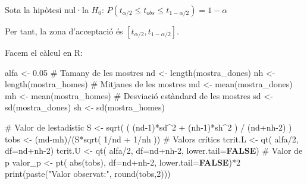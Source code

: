 \documentclass[
]{article}
\newenvironment{Shaded}{\begin{snugshade}}{\end{snugshade}}
\newcommand{\AttributeTok}[1]{\textcolor[rgb]{0.80,0.80,0.80}{#1}}
\newcommand{\CommentTok}[1]{\textcolor[rgb]{0.50,0.62,0.50}{#1}}
\newcommand{\ConstantTok}[1]{\textcolor[rgb]{0.86,0.64,0.64}{\textbf{#1}}}
\newcommand{\DecValTok}[1]{\textcolor[rgb]{0.86,0.86,0.80}{#1}}
\newcommand{\FloatTok}[1]{\textcolor[rgb]{0.75,0.75,0.82}{#1}}
\newcommand{\FunctionTok}[1]{\textcolor[rgb]{0.94,0.94,0.56}{#1}}
\newcommand{\NormalTok}[1]{\textcolor[rgb]{0.80,0.80,0.80}{#1}}
\newcommand{\OtherTok}[1]{\textcolor[rgb]{0.94,0.94,0.56}{#1}}
\newcommand{\SpecialCharTok}[1]{\textcolor[rgb]{0.86,0.64,0.64}{#1}}
\newcommand{\StringTok}[1]{\textcolor[rgb]{0.80,0.58,0.58}{#1}}
\begin{document}
Sota la hipòtesi nul·la \(H_0\):
\(P(t_{\alpha/2}\le t_{obs} \le t_{1-\alpha/2})=1-\alpha\)

Per tant, la zona d'acceptació és \([t_{\alpha/2},t_{1-\alpha/2}]\).

Facem el càlcul en R:

\begin{Shaded}
\begin{Highlighting}[]
\NormalTok{alfa    }\OtherTok{\textless{}{-}} \FloatTok{0.05}
\CommentTok{\# Tamany de les mostres}
\NormalTok{nd }\OtherTok{\textless{}{-}} \FunctionTok{length}\NormalTok{(mostra\_dones)}
\NormalTok{nh }\OtherTok{\textless{}{-}} \FunctionTok{length}\NormalTok{(mostra\_homes)}
\CommentTok{\# Mitjanes de les mostres}
\NormalTok{md }\OtherTok{\textless{}{-}} \FunctionTok{mean}\NormalTok{(mostra\_dones)}
\NormalTok{mh }\OtherTok{\textless{}{-}} \FunctionTok{mean}\NormalTok{(mostra\_homes)}
\CommentTok{\# Desviació estàndard de les mostres}
\NormalTok{sd }\OtherTok{\textless{}{-}} \FunctionTok{sd}\NormalTok{(mostra\_dones)}
\NormalTok{sh }\OtherTok{\textless{}{-}} \FunctionTok{sd}\NormalTok{(mostra\_homes)}

\CommentTok{\# Valor de l\textquotesingle{}estadístic}
\NormalTok{S    }\OtherTok{\textless{}{-}} \FunctionTok{sqrt}\NormalTok{( ( (nd}\DecValTok{{-}1}\NormalTok{)}\SpecialCharTok{*}\NormalTok{sd}\SpecialCharTok{\^{}}\DecValTok{2} \SpecialCharTok{+}\NormalTok{ (nh}\DecValTok{{-}1}\NormalTok{)}\SpecialCharTok{*}\NormalTok{sh}\SpecialCharTok{\^{}}\DecValTok{2}\NormalTok{ ) }\SpecialCharTok{/}\NormalTok{ (nd}\SpecialCharTok{+}\NormalTok{nh}\DecValTok{{-}2}\NormalTok{) )}
\NormalTok{tobs }\OtherTok{\textless{}{-}}\NormalTok{ (md}\SpecialCharTok{{-}}\NormalTok{mh)}\SpecialCharTok{/}\NormalTok{(S}\SpecialCharTok{*}\FunctionTok{sqrt}\NormalTok{( }\DecValTok{1}\SpecialCharTok{/}\NormalTok{nd }\SpecialCharTok{+} \DecValTok{1}\SpecialCharTok{/}\NormalTok{nh ))}
\CommentTok{\# Valors crítics}
\NormalTok{tcrit.L }\OtherTok{\textless{}{-}} \FunctionTok{qt}\NormalTok{( alfa}\SpecialCharTok{/}\DecValTok{2}\NormalTok{, }\AttributeTok{df=}\NormalTok{nd}\SpecialCharTok{+}\NormalTok{nh}\DecValTok{{-}2}\NormalTok{)}
\NormalTok{tcrit.U }\OtherTok{\textless{}{-}} \FunctionTok{qt}\NormalTok{( alfa}\SpecialCharTok{/}\DecValTok{2}\NormalTok{, }\AttributeTok{df=}\NormalTok{nd}\SpecialCharTok{+}\NormalTok{nh}\DecValTok{{-}2}\NormalTok{, }\AttributeTok{lower.tail=}\ConstantTok{FALSE}\NormalTok{)}
\CommentTok{\# Valor de p}
\NormalTok{valor\_p }\OtherTok{\textless{}{-}} \FunctionTok{pt}\NormalTok{( }\FunctionTok{abs}\NormalTok{(tobs), }\AttributeTok{df=}\NormalTok{nd}\SpecialCharTok{+}\NormalTok{nh}\DecValTok{{-}2}\NormalTok{, }\AttributeTok{lower.tail=}\ConstantTok{FALSE}\NormalTok{)}\SpecialCharTok{*}\DecValTok{2}
\FunctionTok{print}\NormalTok{(}\FunctionTok{paste}\NormalTok{(}\StringTok{"Valor observat:"}\NormalTok{, }\FunctionTok{round}\NormalTok{(tobs,}\DecValTok{2}\NormalTok{)))}
\end{Highlighting}
\end{Shaded}
\end{document}
